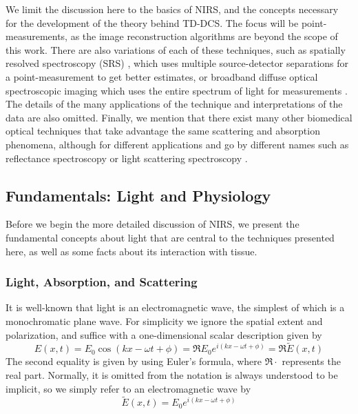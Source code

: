 We limit the discussion here to the basics of NIRS, and the concepts necessary for the development of the theory behind TD-DCS. The focus will be point-measurements, as the image reconstruction algorithms \cite{Oleary1996thesis} are beyond the scope of this work. There are also variations of each of these techniques, such as spatially resolved spectroscopy (SRS) \cite{Wolf2007}, \cite[ch. 2.4.2]{Madsen2013} which uses multiple source-detector separations for a point-measurement to get better estimates, or broadband diffuse optical spectroscopic imaging which uses the entire spectrum of light for measurements \cite[ch. 9]{Handbook}. The details of the many applications of the technique and interpretations of the data are also omitted. Finally, we mention that there exist many other biomedical optical techniques that take advantage the same scattering and absorption phenomena, although for different applications and go by different names such as reflectance spectroscopy \cite[ch. 6]{Handbook} or light scattering spectroscopy \cite[ch. 8]{Handbook}.
 
\subsection{Fundamentals: Light and Physiology} \label{sec:NIRS_fundamentals}
Before we begin the more detailed discussion of NIRS, we present the fundamental concepts about light that are central to the techniques presented here, as well as some facts about its interaction with tissue. 

\subsubsection{Light, Absorption, and Scattering}
It is well-known that light is an electromagnetic wave, the simplest of which is a monochromatic plane wave. For simplicity we ignore the spatial extent and polarization, and suffice with a one-dimensional scalar description given by%
\begin{equation} \label{eq:plane_wave_cos}
E(x,t) = E_0\cos(kx - \omega t + \phi) = \Re{E_0e^{i(kx-\omega t+\phi)}} = \Re{\tilde{E}(x,t)}
\end{equation}
The second equality is given by using Euler's formula, where $\Re{\cdot}$ represents the real part. Normally, it is omitted from the notation is always understood to be implicit, so we simply refer to an electromagnetic wave by
\begin{equation}\label{eq:plane_wave}
\tilde{E}(x,t) = E_0e^{i(kx-\omega t+\phi)}
\end{equation}

